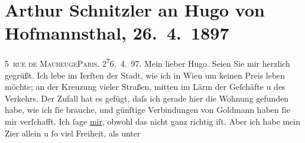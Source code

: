 

         
         \newcommand{\erwaehntePersonen}{Personen: Maurice Donnay, Paul Goldmann, Gustave Guiches, Abel Hermant, Paul Ernest Hervieu, Hugo von Hofmannsthal, Hugo August von Hofmannsthal, Anna von Hofmannsthal, Ferdinand Raimund, Marie Reinhard}
         \newcommand{\erwaehnteOrte}{Orte: Paris, Wien, rue de Maubeuge}
         \newcommand{\erwaehnteWerke}{Werke: Der Alpenkönig und der Menschenfeind, La Carrière, La Douloureuse, Männerrecht, Snob}
               \section[Arthur Schnitzler an Hugo von Hofmannsthal, 26. 4. 1897]{ Arthur Schnitzler an Hugo von Hofmannsthal, 26. 4. 1897}\nopagebreak{}\rehead{ }\begin{ledgroupsized}[t]{13cm}\normalsize\beginnumbering \toendnotes[C]{\smallbreak\pagebreak[2]} 
\toendnotes[C]{\smallbreak}\pstart
           \raggedleft{}{\pb}5 \textsc{rue \introOben{}de\introOben{} Maubeuge}\textsc{Paris}. 2\substVorne{}\textsuperscript{7}\substDazwischen{}6\substHinten{}. 4. 97.\pend
           \pstart
           Mein lieber Hugo. Seien Sie mir herzlich gegrüßt. Ich lebe im
                        I{\geminationn}erſten der Stadt, wie ich in Wien um keinen Preis leben möchte; an der Kreuzung vieler
                    Straßen, mitten im Lärm der Geſchäfte u des Verkehrs. Der Zufall hat es gefügt,
                    daſs ich gerade hier die Wohnung gefunden habe, wie ich ſie brauche, und
                    günſtige Verbindungen von Goldmann haben ſie
                    mir verſchafft. Ich ſage \uline{mir}, obwohl das nicht
                    ganz richtig iſt. Aber ich habe mein Zi{\geminationm}er allein u ſo viel Freiheit, als unter

\end{ledgroupsized}
